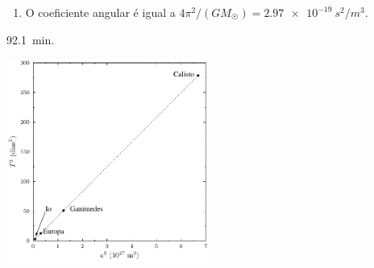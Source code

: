 \documentclass[a4paper]{article}
\begin{document}
\begin{respostas}
\begin{exercicio}
\begin{enumerate}
  \item O coeficiente angular é igual a $4\pi^2/(GM_{\astrosun}) = \SI{2.97e-19}{s^2/m^3}$.
  
  \end{enumerate}
  \end{exercicio}
  
  \begin{exercicio}
   \SI{92.1}{min}.
  \end{exercicio}
  
  \begin{exercicio*}
    \begin{center}
      \includegraphics[width=0.5\textwidth]{Io_cia}
    \end{center}
  \end{exercicio*}
\end{respostas}
\end{document}
